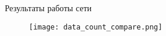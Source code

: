 
\begin{frame}{Результаты работы сети}
\begin{figure}
\centering
\texttt{[image: data\_count\_compare.png]}
\end{figure}
\end{frame}